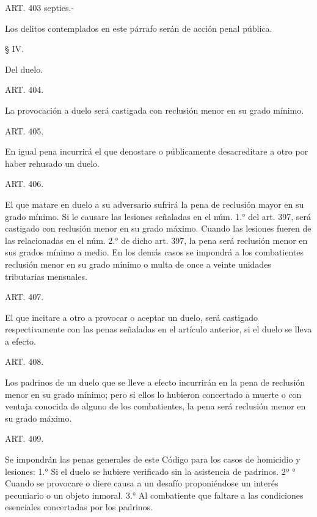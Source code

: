     ART. 403 septies.-

    Los delitos contemplados en este párrafo serán de acción penal pública.


    § IV.

    Del duelo.


    ART. 404.

    La provocación a duelo será castigada con reclusión menor en su grado mínimo.



    ART. 405.

    En igual pena incurrirá el que denostare o públicamente desacreditare a otro por haber rehusado un duelo.


    ART. 406.

    El que matare en duelo a su adversario sufrirá la pena de reclusión mayor en su grado mínimo.
    Si le causare las lesiones señaladas en el núm. 1.° del art. 397, será castigado con reclusión menor en su grado máximo.
    Cuando las lesiones fueren de las relacionadas en el núm. 2.° de dicho art. 397, la pena será reclusión menor en sus grados mínimo a medio.
    En los demás casos se impondrá a los combatientes reclusión menor en su grado mínimo o multa de once a veinte unidades tributarias mensuales.








    ART. 407.

    El que incitare a otro a provocar o aceptar un duelo, será castigado respectivamente con las penas señaladas en el artículo anterior, si el duelo se lleva a efecto.



    ART. 408.

    Los padrinos de un duelo que se lleve a efecto incurrirán en la pena de reclusión menor en su grado mínimo; pero si ellos lo hubieron concertado a muerte o con ventaja conocida de alguno de los combatientes, la pena será reclusión menor en su grado máximo.



    ART. 409.

    Se impondrán las penas generales de este Código para los casos de homicidio y lesiones:
    1.° Si el duelo se hubiere verificado sin la asistencia de padrinos.
    2º ° Cuando se provocare o diere causa a un desafío proponiéndose un interés pecuniario o un objeto inmoral.
    3.° Al combatiente que faltare a las condiciones esenciales concertadas por los padrinos.


